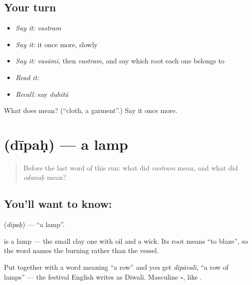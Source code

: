 \subsection*{Your turn}
\begin{itemize}
\raggedright
  \item \emph{Say it:} \emph{vastram}
  \item \emph{Say it:} it once more, slowly
  \item \emph{Say it:} \emph{vasāmi}, then \emph{vastram}, and say which root each one belongs to
  \item \emph{Read it:} \textbf{}
  \item \emph{Recall:} say \emph{duhitā}
\end{itemize}

\begin{tcolorbox}[breakable,colback=teal!4,colframe=teal!35!black,title={Before you move on}]
What does  mean? (\textquotedblleft{}cloth, a garment\textquotedblright{}.) Say it once more.
\end{tcolorbox}
\section[\texorpdfstring{\sk{दीपः} (dīpaḥ)}{दीपः (dīpaḥ)}]{ (dīpaḥ) — a lamp}

\label{lesson:SA-C24-lamp}



\begin{quote}
Before the last word of this run: what did \emph{vastram} mean, and what did \emph{odanaḥ} mean?
\end{quote}

\subsection*{You'll want to know: }
\textbf{} (\emph{dīpaḥ}) — \textquotedblleft{}a lamp\textquotedblright{}.

\textbf{} is a lamp — the small clay one with oil and a wick. Its root means \textquotedblleft{}to blaze\textquotedblright{}, so the word names the burning rather than the vessel.

Put  together with a word meaning \textquotedblleft{}a row\textquotedblright{} and you get \emph{dīpāvalī}, \textquotedblleft{}a row of lamps\textquotedblright{} — the festival English writes as Diwali. Masculine \textbf{-}, like .

